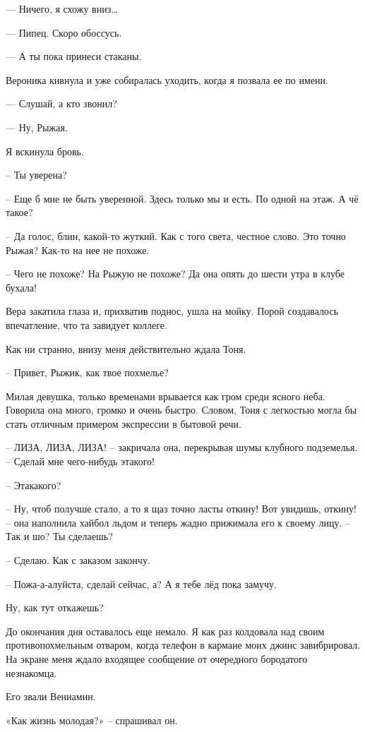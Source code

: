 \documentclass[
]{book}
\begin{document}
--- Ничего, я схожу вниз\ldots{}

--- Пипец. Скоро обоссусь.

--- А ты пока принеси стаканы.

Вероника кивнула и уже собиралась уходить, когда я позвала ее по имени.

--- Слушай, а кто звонил?

--- Ну, Рыжая.

Я вскинула бровь.

-- Ты уверена?

-- Еще б мне не быть уверенной. Здесь только мы и есть. По одной на этаж. А чё такое?

-- Да голос, блин, какой-то жуткий. Как с того света, честное слово. Это точно Рыжая? Как-то на нее не похоже.

-- Чего не похоже? На Рыжую не похоже? Да она опять до шести утра в клубе бухала!

Вера закатила глаза и, прихватив поднос, ушла на мойку. Порой создавалось впечатление, что та завидует коллеге.

Как ни странно, внизу меня действительно ждала Тоня.

-- Привет, Рыжик, как твое похмелье?

Милая девушка, только временами врывается как гром среди ясного неба. Говорила она много, громко и очень быстро. Словом, Тоня с легкостью могла бы стать отличным примером экспрессии в бытовой речи.

-- ЛИЗА, ЛИЗА, ЛИЗА! -- закричала она, перекрывая шумы клубного подземелья. -- Сделай мне чего-нибудь этакого!

-- Этакакого?

-- Ну, чтоб получше стало, а то я щаз точно ласты откину! Вот увидишь, откину! -- она наполнила хайбол льдом и теперь жадно прижимала его к своему лицу. -- Так и шо? Ты сделаешь?

-- Сделаю. Как с заказом закончу.

-- Пожа-а-алуйста, сделай сейчас, а? А я тебе лёд пока замучу.

Ну, как тут откажешь?

До окончания дня оставалось еще немало. Я как раз колдовала над своим противопохмельным отваром, когда телефон в кармане моих джинс завибрировал. На экране меня ждало входящее сообщение от очередного бородатого незнакомца.

Его звали Вениамин.

«Как жизнь молодая?» -- спрашивал он.
\end{document}
